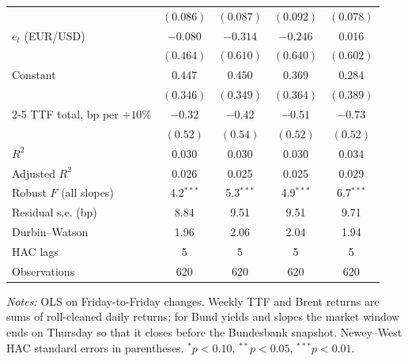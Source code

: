 \documentclass[11pt,a4paper]{article}
\begin{document}
\begin{table}[htbp]
\begin{tabular}{@{}l*{4}{c}@{}}
 & $(0.086)$ & $(0.087)$ & $(0.092)$ & $(0.078)$\\
$e_t$ (EUR/USD) & $-0.080$ & $-0.314$ & $-0.246$ & $0.016$\\
 & $(0.464)$ & $(0.610)$ & $(0.640)$ & $(0.602)$\\
Constant & $0.447$ & $0.450$ & $0.369$ & $0.284$\\
 & $(0.346)$ & $(0.349)$ & $(0.364)$ & $(0.389)$\\
\cmidrule(l){2-5}
TTF total, bp per $+10\%$ & $-0.32$ & $-0.42$ & $-0.51$ & $-0.73$\\
 & $(0.52)$ & $(0.54)$ & $(0.52)$ & $(0.52)$\\
$R^2$ & 0.030 & 0.030 & 0.030 & 0.034\\
Adjusted $R^2$ & 0.026 & 0.025 & 0.025 & 0.029\\
Robust $F$ (all slopes) & 4.2$^{***}$ & 5.3$^{***}$ & 4.9$^{***}$ & 6.7$^{***}$\\
Residual s.e. (bp) & 8.84 & 9.51 & 9.51 & 9.71\\
Durbin--Watson & 1.96 & 2.06 & 2.04 & 1.94\\
HAC lags & 5 & 5 & 5 & 5\\
Observations & 620 & 620 & 620 & 620\\
\bottomrule
\end{tabular}
\par\vspace{4pt}\begin{minipage}{0.94\textwidth}\scriptsize\textit{Notes:} OLS on Friday-to-Friday changes. Weekly TTF and Brent returns are sums of roll-cleaned daily returns; for Bund yields and slopes the market window ends on Thursday so that it closes before the Bundesbank snapshot. Newey--West HAC standard errors in parentheses. $^{*}p<0.10$, $^{**}p<0.05$, $^{***}p<0.01$.\end{minipage}
\end{table}
\end{document}
